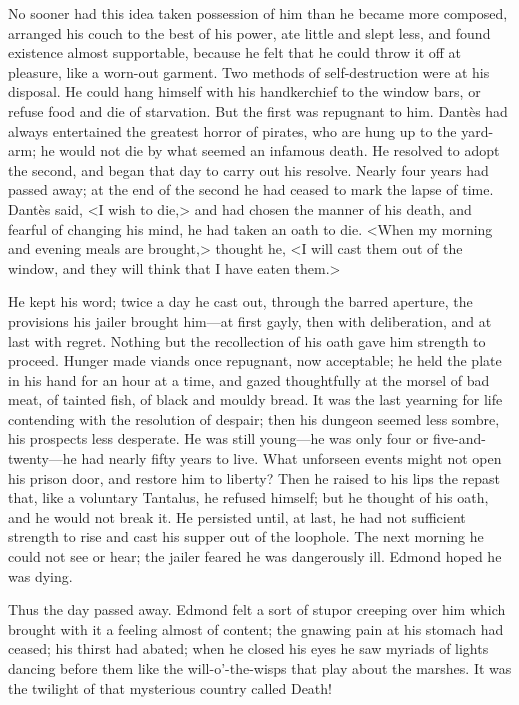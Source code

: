 No sooner had this idea taken possession of him than he became more composed, arranged his couch to the best of his power, ate little and slept less, and found existence almost supportable, because he felt that he could throw it off at pleasure, like a worn-out garment. Two methods of self-destruction were at his disposal. He could hang himself with his handkerchief to the window bars, or refuse food and die of starvation. But the first was repugnant to him. Dantès had always entertained the greatest horror of pirates, who are hung up to the yard-arm; he would not die by what seemed an infamous death. He resolved to adopt the second, and began that day to carry out his resolve.  Nearly four years had passed away; at the end of the second he had ceased to mark the lapse of time. Dantès said, <I wish to die,> and had chosen the manner of his death, and fearful of changing his mind, he had taken an oath to die. <When my morning and evening meals are brought,> thought he, <I will cast them out of the window, and they will think that I have eaten them.> 

 He kept his word; twice a day he cast out, through the barred aperture, the provisions his jailer brought him—at first gayly, then with deliberation, and at last with regret. Nothing but the recollection of his oath gave him strength to proceed. Hunger made viands once repugnant, now acceptable; he held the plate in his hand for an hour at a time, and gazed thoughtfully at the morsel of bad meat, of tainted fish, of black and mouldy bread. It was the last yearning for life contending with the resolution of despair; then his dungeon seemed less sombre, his prospects less desperate. He was still young—he was only four or five-and-twenty—he had nearly fifty years to live. What unforseen events might not open his prison door, and restore him to liberty? Then he raised to his lips the repast that, like a voluntary Tantalus, he refused himself; but he thought of his oath, and he would not break it. He persisted until, at last, he had not sufficient strength to rise and cast his supper out of the loophole. The next morning he could not see or hear; the jailer feared he was dangerously ill. Edmond hoped he was dying. 

 Thus the day passed away. Edmond felt a sort of stupor creeping over him which brought with it a feeling almost of content; the gnawing pain at his stomach had ceased; his thirst had abated; when he closed his eyes he saw myriads of lights dancing before them like the will-o'-the-wisps that play about the marshes. It was the twilight of that mysterious country called Death! 

